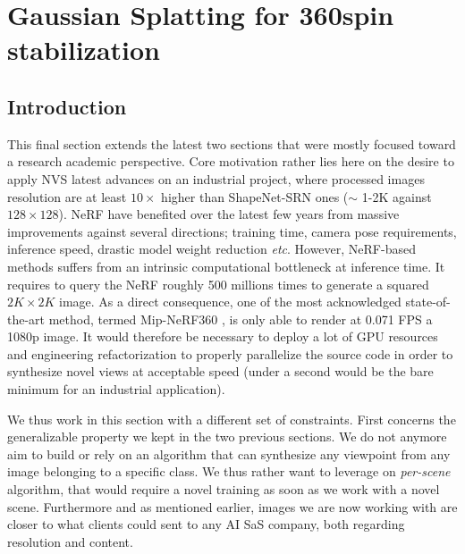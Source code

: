 \chapter{Gaussian Splatting for 360\degree spin stabilization}
\label{chapter:gausssplat}

 


\section{Introduction}
This final section extends the latest two sections that were mostly focused toward a research academic perspective. Core motivation rather lies here on the desire to apply \ac{NVS} latest advances on an industrial project, where processed images resolution are at least $10\times$ higher than ShapeNet-SRN \citep{chang2015shapenet,sitzmann2019scene} ones ($\sim$ 1-2K against $128\times128$). \ac{NeRF} have benefited over the latest few years from massive improvements against several directions; training time, camera pose requirements, inference speed, drastic model weight reduction \textit{etc}. 
However, \ac{NeRF}-based methods suffers from an intrinsic computational bottleneck at inference time. It requires to query the \ac{NeRF} roughly 500 millions times to generate a squared $2K\times2K$ image. As a direct consequence, one of the most acknowledged state-of-the-art method, termed Mip-NeRF360 \citep{barron2022mip}, is only able to render at 0.071 \ac{FPS} a 1080p image. It would therefore be necessary to deploy a lot of \ac{GPU} resources and engineering refactorization to properly parallelize the source code in order to synthesize novel views at acceptable speed (under a second would be the bare minimum for an industrial application). 


We thus work in this section with a different set of constraints. First concerns the generalizable property we kept in the two previous sections. We do not anymore aim to build or rely on an algorithm that can synthesize any viewpoint from any image belonging to a specific class. We thus rather want to leverage on \textit{per-scene} algorithm, that would require a novel training as soon as we work with a novel scene. Furthermore and as mentioned earlier, images we are now working with are closer to what clients could sent to any \ac{AI} SaS company, both regarding resolution and content. 


